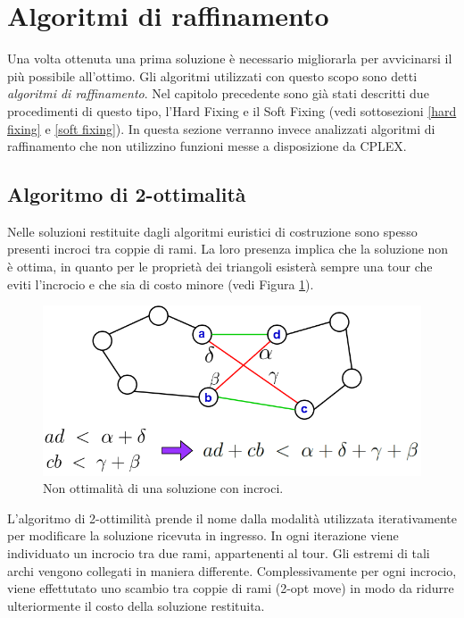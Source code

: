 \section{Algoritmi di raffinamento}
Una volta ottenuta una prima soluzione è necessario migliorarla per avvicinarsi il più possibile all'ottimo. Gli algoritmi utilizzati con questo scopo sono detti \textit{algoritmi di raffinamento}. Nel capitolo precedente sono già stati descritti due procedimenti di questo tipo, l'Hard Fixing e il Soft Fixing (vedi sottosezioni \ref{hard fixing} e \ref{soft fixing}). In questa sezione verranno invece analizzati algoritmi di raffinamento che non utilizzino funzioni messe a disposizione da CPLEX.

\subsection{Algoritmo di 2-ottimalità}
Nelle soluzioni restituite dagli algoritmi euristici di costruzione sono spesso presenti incroci tra coppie di rami. La loro presenza implica che la soluzione non è ottima, in quanto per le proprietà dei triangoli esisterà sempre una tour che eviti l'incrocio e che sia di costo minore (vedi Figura \ref{cross}). 
\begin{figure}[H] 
\begin{center} 
  \includegraphics[scale=0.5]{Images/triangle_property}
  \caption{\footnotesize{Non ottimalità di una soluzione con incroci.}}
  \label{cross}
\end{center}
\end{figure}
L'algoritmo di 2-ottimilità prende il nome dalla modalità utilizzata iterativamente per modificare la soluzione ricevuta in ingresso. In ogni iterazione viene individuato un incrocio tra due rami, appartenenti al tour. Gli estremi di tali archi vengono collegati in maniera differente. Complessivamente per ogni incrocio, viene effettutato uno scambio tra coppie di rami (2-opt move) in modo da ridurre ulteriormente il costo della soluzione restituita.\\
